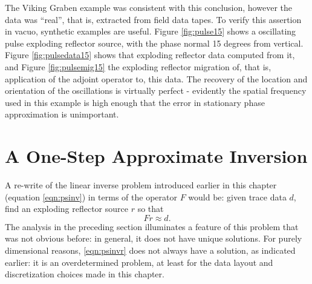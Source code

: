 The Viking Graben example was consistent with this conclusion, however the data was ``real'', that is, extracted from field data tapes. To verify this assertion in vacuo, synthetic examples are useful. Figure \ref{fig:pulse15} shows a oscillating pulse exploding reflector source, with the phase normal 15 degrees from vertical. Figure \ref{fig:pulsedata15} shows that exploding reflector data computed from it, and Figure \ref{fig:pulsemig15} the exploding reflector migration of, that is, application of the adjoint operator to, this data. The recovery of the location and orientation of the oscillations is virtually perfect - evidently the spatial frequency used in this example is high enough that the error in stationary phase approximation is unimportant.

\section{A One-Step Approximate Inversion}
A re-write of the linear inverse problem introduced earlier in this chapter (equation \ref{eqn:psinv}) in terms of the operator $F$ would be: given trace data $d$, find an exploding reflector source $r$ so that
\begin{equation}
\label{eqn:psinvr}
Fr \approx d.
\end{equation} 
The analysis in the preceding section illuminates a feature of this problem that was not obvious before: in general, it does not have unique solutions. For purely dimensional reasons, \ref{eqn:psinvr} does not always have a solution, as indicated earlier: it is an overdetermined problem, at least for the data layout and discretization choices made in this chapter. 

